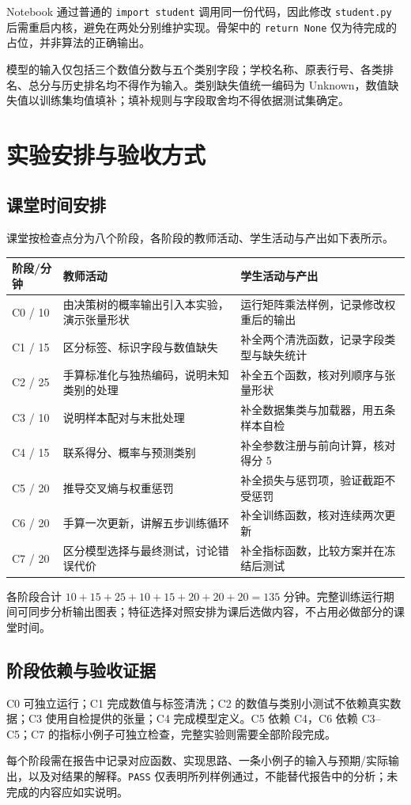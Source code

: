\documentclass[UTF8,a4paper,11pt,fontset=fandol]{ctexart}
\newcommand{\file}[1]{\nolinkurl{#1}}
\begin{document}
Notebook 通过普通的 \texttt{import student} 调用同一份代码，因此修改 \file{student.py} 后需重启内核，避免在两处分别维护实现。骨架中的 \texttt{return None} 仅为待完成的占位，并非算法的正确输出。
\begin{pitfallbox}[明确模型的输入边界]
模型的输入仅包括三个数值分数与五个类别字段；学校名称、原表行号、各类排名、总分与历史排名均不得作为输入。类别缺失值统一编码为 Unknown，数值缺失值以训练集均值填补；填补规则与字段取舍均不得依据测试集确定。
\end{pitfallbox}
\clearpage
\section{实验安排与验收方式}
\subsection{课堂时间安排}
课堂按检查点分为八个阶段，各阶段的教师活动、学生活动与产出如下表所示。
\par\noindent\begin{tabularx}{\linewidth}{L{1.7cm}Y Y}\toprule
阶段/分钟 & 教师活动 & 学生活动与产出\\\midrule
C0 / 10 & 由决策树的概率输出引入本实验，演示张量形状 & 运行矩阵乘法样例，记录修改权重后的输出\\
C1 / 15 & 区分标签、标识字段与数值缺失 & 补全两个清洗函数，记录字段类型与缺失统计\\
C2 / 25 & 手算标准化与独热编码，说明未知类别的处理 & 补全五个函数，核对列顺序与张量形状\\
C3 / 10 & 说明样本配对与末批处理 & 补全数据集类与加载器，用五条样本自检\\
C4 / 15 & 联系得分、概率与预测类别 & 补全参数注册与前向计算，核对得分 5\\
C5 / 20 & 推导交叉熵与权重惩罚 & 补全损失与惩罚项，验证截距不受惩罚\\
C6 / 20 & 手算一次更新，讲解五步训练循环 & 补全训练函数，核对连续两次更新\\
C7 / 20 & 区分模型选择与最终测试，讨论错误代价 & 补全指标函数，比较方案并在冻结后测试\\\bottomrule
\end{tabularx}
各阶段合计 $10+15+25+10+15+20+20+20=135$ 分钟。完整训练运行期间可同步分析输出图表；特征选择对照安排为课后选做内容，不占用必做部分的课堂时间。
\subsection{阶段依赖与验收证据}
C0 可独立运行；C1 完成数值与标签清洗；C2 的数值与类别小测试不依赖真实数据；C3 使用自检提供的张量；C4 完成模型定义。C5 依赖 C4，C6 依赖 C3--C5；C7 的指标小例子可独立检查，完整实验则需要全部阶段完成。
\begin{questionbox}[检查点验收]
每个阶段需在报告中记录对应函数、实现思路、一条小例子的输入与预期/实际输出，以及对结果的解释。\texttt{PASS} 仅表明所列样例通过，不能替代报告中的分析；未完成的内容应如实说明。
\end{questionbox}
\end{document}
